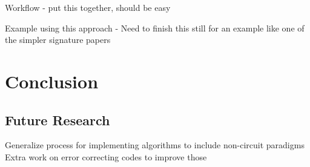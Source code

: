 \documentclass[sigconf]{acmart}
\begin{document}
Workflow - put this together, should be easy

Example using this approach - Need to finish this still for an example like one of the simpler signature papers




\section{Conclusion}

\subsection{Future Research}
Generalize process for implementing algorithms to include non-circuit paradigms 
Extra work on error correcting codes to improve those


{}

\end{document}
